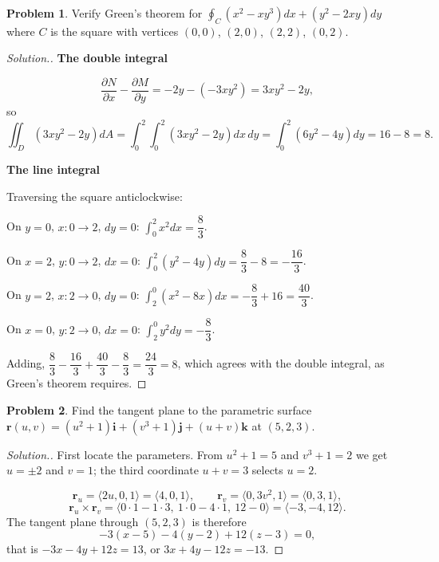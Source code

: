 \documentclass[11pt,a4paper]{article}
\theoremstyle{definition}
\newtheorem{problemx}{Problem}[subsection]
\newenvironment{problem}{\begin{problemx}}{\end{problemx}}
\newenvironment{solution}
  {\renewcommand{\qedsymbol}{}\begin{proof}[\textit{Solution}.]}
  {\end{proof}}
\newcommand{\subhead}[1]{%
  \par\medskip\noindent\textbf{#1}\par\nobreak\smallskip}
\begin{document}
\begin{problem}
Verify Green's theorem for
$\displaystyle{\oint_C(x^2-xy^3)dx + (y^2-2xy)dy}$ where $C$ is
the square with vertices $(0,0)$, $(2,0)$, $(2,2)$, $(0,2)$.
\end{problem}
\begin{solution}
\subhead{The double integral}
\[\frac{\partial N}{\partial x} - \frac{\partial M}{\partial y}
= -2y - (-3xy^2) = 3xy^2 - 2y ,\]
so
\[\iint_D(3xy^2-2y)dA
= \int_0^2\int_0^2(3xy^2-2y)dx\,dy
= \int_0^2(6y^2-4y)dy = 16-8 = 8 .\]

\subhead{The line integral}
Traversing the square anticlockwise:

On $y=0$, $x: 0\rightarrow 2$, $dy=0$: $\int_0^2x^2dx = \dfrac83$.

On $x=2$, $y: 0\rightarrow 2$, $dx=0$:
$\int_0^2(y^2-4y)dy = \dfrac83-8 = -\dfrac{16}{3}$.

On $y=2$, $x: 2\rightarrow 0$, $dy=0$:
$\int_2^0(x^2-8x)dx = -\dfrac83+16 = \dfrac{40}{3}$.

On $x=0$, $y: 2\rightarrow 0$, $dx=0$:
$\int_2^0y^2dy = -\dfrac83$.

Adding, $\dfrac83 - \dfrac{16}{3} + \dfrac{40}{3} - \dfrac83 = \dfrac{24}{3}
= 8$, which agrees with the double integral, as Green's theorem requires.
\end{solution}


\begin{problem}
Find the tangent plane to the parametric surface
$\mathbf r(u,v) = (u^2+1)\mathbf{i} + (v^3+1)\mathbf{j}
+ (u+v)\mathbf{k}$ at $(5,2,3)$.
\end{problem}
\begin{solution}
First locate the parameters. From $u^2+1 = 5$ and $v^3+1 = 2$ we get
$u = \pm 2$ and $v = 1$; the third coordinate $u+v = 3$ selects $u = 2$.

\[\mathbf r_u = \langle 2u, 0, 1\rangle = \langle 4,0,1\rangle,\qquad
\mathbf r_v = \langle 0, 3v^2, 1\rangle = \langle 0,3,1\rangle ,\]
\[\mathbf r_u\times\mathbf r_v
= \langle 0\cdot 1 - 1\cdot 3,\ 1\cdot 0 - 4\cdot 1,\ 12-0\rangle
= \langle -3, -4, 12\rangle .\]
The tangent plane through $(5,2,3)$ is therefore
\[-3(x-5) - 4(y-2) + 12(z-3) = 0 ,\]
that is $-3x-4y+12z = 13$, or $3x+4y-12z = -13$.
\end{solution}
\end{document}
